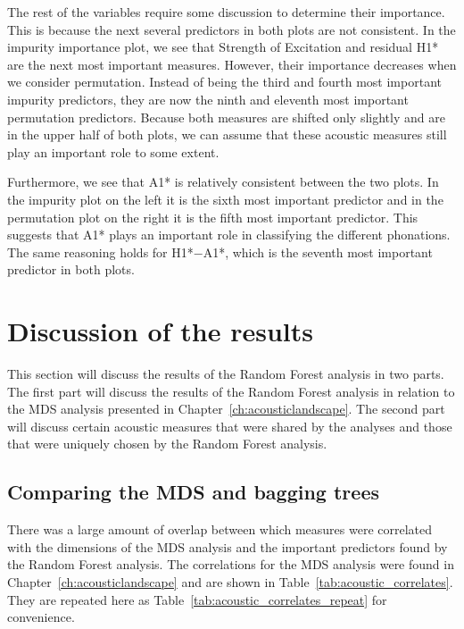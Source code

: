 The rest of the variables require some discussion to determine their importance. This is because the next several predictors in both plots are not consistent. In the impurity importance plot, we see that Strength of Excitation and residual H1* are the next most important measures. However, their importance decreases when we consider permutation. Instead of being the third and fourth most important impurity predictors, they are now the ninth and eleventh most important permutation predictors. Because both measures are shifted only slightly and are in the upper half of both plots, we can assume that these acoustic measures still play an important role to some extent.

Furthermore, we see that A1* is relatively consistent between the two plots. In the impurity plot on the left it is the sixth most important predictor and in the permutation plot on the right it is the fifth most important predictor. This suggests that A1* plays an important role in classifying the different phonations. The same reasoning holds for H1*$-$A1*, which is the seventh most important predictor in both plots. 

\section{Discussion of the results} \label{sec:dt_discussion}

This section will discuss the results of the Random Forest analysis in two parts. The first part will discuss the results of the Random Forest analysis in relation to the MDS analysis presented in Chapter~\ref{ch:acousticlandscape}. The second part will discuss certain acoustic measures that were shared by the analyses and those that were uniquely chosen by the Random Forest analysis. 
\subsection{Comparing the MDS and bagging trees} \label{sec:dt_mds}
There was a large amount of overlap between which measures were correlated with the dimensions of the MDS analysis and the important predictors found by the Random Forest analysis. The correlations for the MDS analysis were found in Chapter~\ref{ch:acousticlandscape} and are shown in Table~\ref{tab:acoustic_correlates}. They are repeated here as Table~\ref{tab:acoustic_correlates_repeat} for convenience.  

